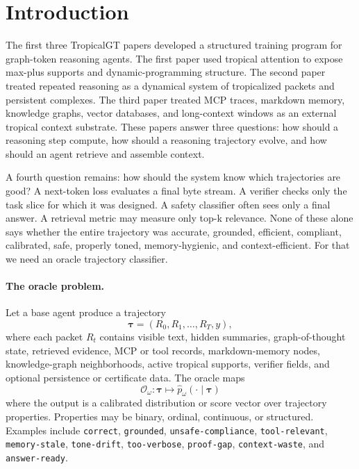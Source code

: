 \documentclass[11pt]{article}
\theoremstyle{definition}
\theoremstyle{remark}
\newcommand{\traj}{\boldsymbol{\tau}}
\numberwithin{equation}{section}
\begin{document}
\tableofcontents
\newpage

\section{Introduction}

The first three TropicalGT papers developed a structured training program for graph-token reasoning agents.  The first paper used tropical attention to expose max-plus supports and dynamic-programming structure.  The second paper treated repeated reasoning as a dynamical system of tropicalized packets and persistent complexes.  The third paper treated MCP traces, markdown memory, knowledge graphs, vector databases, and long-context windows as an external tropical context substrate.  These papers answer three questions: how should a reasoning step compute, how should a reasoning trajectory evolve, and how should an agent retrieve and assemble context.

A fourth question remains: how should the system know which trajectories are good?  A next-token loss evaluates a final byte stream.  A verifier checks only the task slice for which it was designed.  A safety classifier often sees only a final answer.  A retrieval metric may measure only top-k relevance.  None of these alone says whether the entire trajectory was accurate, grounded, efficient, compliant, calibrated, safe, properly toned, memory-hygienic, and context-efficient.  For that we need an oracle trajectory classifier.

\paragraph{The oracle problem.}
Let a base agent produce a trajectory
\begin{equation}
    \traj=(R_0,R_1,\ldots,R_T,y),
\end{equation}
where each packet \(R_t\) contains visible text, hidden summaries, graph-of-thought state, retrieved evidence, MCP or tool records, markdown-memory nodes, knowledge-graph neighborhoods, active tropical supports, verifier fields, and optional persistence or certificate data.  The oracle maps
\begin{equation}
    \mathcal O_\omega:\traj\longmapsto \hat p_\omega(\cdot\mid \traj)
\end{equation}
where the output is a calibrated distribution or score vector over trajectory properties.  Properties may be binary, ordinal, continuous, or structured.  Examples include \texttt{correct}, \texttt{grounded}, \texttt{unsafe-compliance}, \texttt{tool-relevant}, \texttt{memory-stale}, \texttt{tone-drift}, \texttt{too-verbose}, \texttt{proof-gap}, \texttt{context-waste}, and \texttt{answer-ready}.
\end{document}

